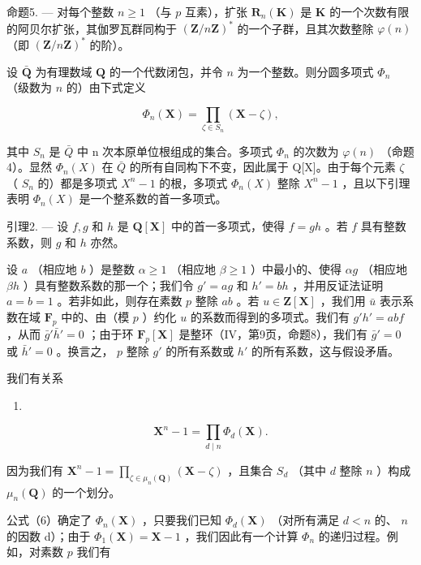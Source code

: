 命题5. --- 对每个整数 \(n \geqslant 1\) （与 \(p\) 互素），扩张 \(\mathbf{R}_n(\mathbf{K})\) 是 \(\mathbf{K}\) 的一个次数有限的阿贝尔扩张，其伽罗瓦群同构于 \((\mathbf{Z}/n\mathbf{Z})^*\) 的一个子群，且其次数整除 \(\varphi(n)\) （即 \((\mathbf{Z}/n\mathbf{Z})^*\) 的阶）。

设 \(\bar{\mathbf{Q}}\) 为有理数域 \(\mathbf{Q}\) 的一个代数闭包，并令 \(n\) 为一个整数。则分圆多项式 \(\Phi_n\) （级数为 \(n\) 的）由下式定义

\[
\Phi_ {n} (\mathbf {X}) = \prod_ {\zeta \in S _ {n}} \left(\mathbf {X} - \zeta\right),\tag{5}
\]

其中 \(S_{n}\) 是 \(\bar{Q}\) 中 n 次本原单位根组成的集合。多项式 \(\Phi_{n}\) 的次数为 \(\varphi(n)\) （命题4）。显然 \(\Phi_{n}(X)\) 在 \(\bar{Q}\) 的所有自同构下不变，因此属于 Q{[}X{]}。由于每个元素 \(\zeta\) （ \(S_{n}\) 的）都是多项式 \(X^{n}-1\) 的根，多项式 \(\Phi_{n}(X)\) 整除 \(X^{n}-1\) ，且以下引理表明 \(\Phi_{n}(X)\) 是一个整系数的首一多项式。

引理2. --- 设 \(f, g\) 和 \(h\) 是 \(\mathbf{Q}[\mathbf{X}]\) 中的首一多项式，使得 \(f = gh\) 。若 \(f\) 具有整数系数，则 \(g\) 和 \(h\) 亦然。

设 \(a\) （相应地 \(b\) ）是整数 \(\alpha \geqslant 1\) （相应地 \(\beta \geqslant 1\) ）中最小的、使得 \(\alpha g\) （相应地 \(\beta h\) ）具有整数系数的那一个；我们令 \(g' = ag\) 和 \(h' = bh\) ，并用反证法证明 \(a = b = 1\) 。若非如此，则存在素数 \(p\) 整除 \(ab\) 。若 \(u \in \mathbf{Z}[\mathbf{X}]\) ，我们用 \(\bar{u}\) 表示系数在域 \(\mathbf{F}_p\) 中的、由（模 \(p\) ）约化 \(u\) 的系数而得到的多项式。我们有 \(g'h' = abf\) ，从而 \(\bar{g}'\bar{h}' = 0\) ；由于环 \(\mathbf{F}_p[\mathbf{X}]\) 是整环（IV，第9页，命题8），我们有 \(\bar{g}' = 0\) 或 \(\bar{h}' = 0\) 。换言之， \(p\) 整除 \(g'\) 的所有系数或 \(h'\) 的所有系数，这与假设矛盾。

我们有关系

\begin{enumerate}
\def\labelenumi{(\arabic{enumi})}
\setcounter{enumi}{5}
\tightlist
\item
\end{enumerate}

\[
\mathbf {X} ^ {n} - 1 = \prod_ {d \mid n} \Phi_ {d} (\mathbf {X}).
\]

因为我们有 \(\mathbf{X}^n - 1 = \prod_{\zeta \in \mu_n(\mathbf{Q})} (\mathbf{X} - \zeta)\) ，且集合 \(S_d\) （其中 \(d\) 整除 \(n\) ）构成 \(\mu_n(\mathbf{Q})\) 的一个划分。

公式（6）确定了 \(\Phi_n(\mathbf{X})\) ，只要我们已知 \(\Phi_d(\mathbf{X})\) （对所有满足 \(d < n\) 的、 \(n\) 的因数 d）；由于 \(\Phi_1(\mathbf{X}) = \mathbf{X} - 1\) ，我们因此有一个计算 \(\Phi_n\) 的递归过程。例如，对素数 \(p\) 我们有

